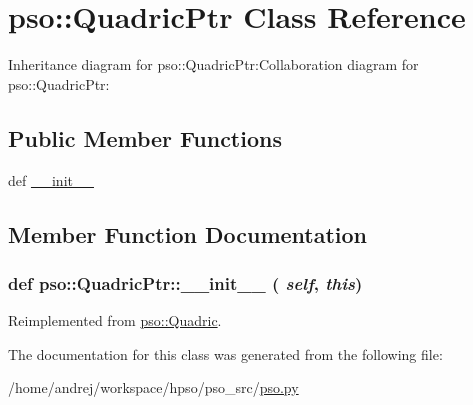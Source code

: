 \hypertarget{classpso_1_1QuadricPtr}{
\section{pso::QuadricPtr Class Reference}
\label{classpso_1_1QuadricPtr}
}
Inheritance diagram for pso::QuadricPtr:Collaboration diagram for pso::QuadricPtr:\subsection*{Public Member Functions}
\begin{CompactItemize}
\item 
def \hyperlink{classpso_1_1QuadricPtr_206857d4cf8c3ad6fad721d0ef9fc966}{\_\-\_\-init\_\-\_\-}
\end{CompactItemize}


\subsection{Member Function Documentation}
\hypertarget{classpso_1_1QuadricPtr_206857d4cf8c3ad6fad721d0ef9fc966}{
\subsubsection{\setlength{\rightskip}{0pt plus 5cm}def pso::QuadricPtr::\_\-\_\-init\_\-\_\- ( {\em self}, \/   {\em this})}}
\label{classpso_1_1QuadricPtr_206857d4cf8c3ad6fad721d0ef9fc966}




Reimplemented from \hyperlink{classpso_1_1Quadric_fed66f973031f5c183bbdb8ac437315c}{pso::Quadric}.

The documentation for this class was generated from the following file:\begin{CompactItemize}
\item 
/home/andrej/workspace/hpso/pso\_\-src/\hyperlink{pso_8py}{pso.py}\end{CompactItemize}
